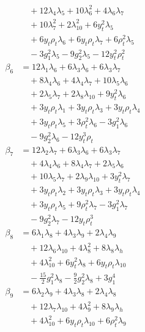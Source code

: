 \documentclass[twocolumn,epjc3]{svjour3}
\begin{document}
\begin{align}
&\quad +12\lambda_4\lambda_5 +10\lambda_6^2 +4\lambda_6\lambda_7\nonumber\\
&\quad +10\lambda_7^2 +2\lambda_{10}^2 +6y_t^2\lambda_5\nonumber\\
&\quad +6y_t\rho_t\lambda_6 +6y_t\rho_t\lambda_7 +6\rho_t^2\lambda_5\nonumber\\
&\quad -3g_1^2\lambda_5 -9g_2^2\lambda_5 -12y_t^2\rho_t^2\\
\beta_{6}&=12\lambda_1\lambda_6 +6\lambda_3\lambda_6 +6\lambda_3\lambda_7\nonumber\\
&\quad +8\lambda_4\lambda_6 +4\lambda_4\lambda_7 +10\lambda_5\lambda_6\nonumber\\
&\quad +2\lambda_5\lambda_7 +2\lambda_8\lambda_{10} +9y_t^2\lambda_6\nonumber\\
&\quad +3y_t\rho_t\lambda_1 +3y_t\rho_t\lambda_3 +3y_t\rho_t\lambda_4\nonumber\\
&\quad +3y_t\rho_t\lambda_5 +3\rho_t^2\lambda_6 -3g_1^2\lambda_6\nonumber\\
&\quad -9g_2^2\lambda_6 -12y_t^3\rho_t\\
\beta_{7}&=12\lambda_2\lambda_7 +6\lambda_3\lambda_6 +6\lambda_3\lambda_7\nonumber\\
&\quad +4\lambda_4\lambda_6 +8\lambda_4\lambda_7 +2\lambda_5\lambda_6\nonumber\\
&\quad +10\lambda_5\lambda_7 +2\lambda_9\lambda_{10} +3y_t^2\lambda_7\nonumber\\
&\quad +3y_t\rho_t\lambda_2 +3y_t\rho_t\lambda_3 +3y_t\rho_t\lambda_4\nonumber\\
&\quad +3y_t\rho_t\lambda_5 +9\rho_t^2\lambda_7 -3g_1^2\lambda_7\nonumber\\
&\quad -9g_2^2\lambda_7 -12y_t\rho_t^3\\
\beta_{8}&=6\lambda_1\lambda_8 +4\lambda_3\lambda_9 +2\lambda_4\lambda_9\nonumber\\
&\quad +12\lambda_6\lambda_{10} +4\lambda_8^2 +8\lambda_8\lambda_h\nonumber\\
&\quad +4\lambda_{10}^2 +6y_t^2\lambda_8 +6y_t\rho_t\lambda_{10}\nonumber\\
&\quad -\tfrac{15}{2}g_1^2\lambda_8 -\tfrac{9}{2}g_2^2\lambda_8 +3g_1^4\\
\beta_{9}&=6\lambda_2\lambda_9 +4\lambda_3\lambda_8 +2\lambda_4\lambda_8\nonumber\\
&\quad +12\lambda_7\lambda_{10} +4\lambda_9^2 +8\lambda_9\lambda_h\nonumber\\
&\quad +4\lambda_{10}^2 +6y_t\rho_t\lambda_{10} +6\rho_t^2\lambda_9\nonumber\\

\end{align}
\end{document}

